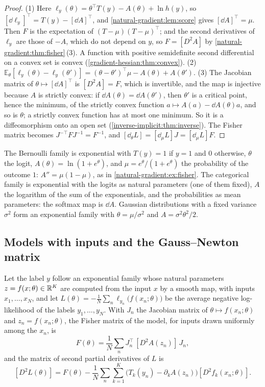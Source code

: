 \begin{notechapter}
\begin{proof}
(1) Here $\ell_y(\theta) = \theta^\top T(y) - A(\theta) + \ln h(y)$, so
$[\dd\ell_y]^\top = T(y) - [\dd A]^\top$, and
\cref{natural-gradient:lem:score} gives $[\dd A]^\top = \mu$. Then $F$ is
the expectation of $(T - \mu)(T - \mu)^\top$; and the second derivatives
of $\ell_y$ are those of $-A$, which do not depend on $y$, so
$F = [D^2A]$ by \cref{natural-gradient:thm:fisher}\,(3). A function with
positive semidefinite second differential on a convex set is convex
(\cref{gradient-hessian:thm:convex}).
(2) $\mathbb E_\theta[\ell_y(\theta) - \ell_y(\theta')]
= (\theta - \theta')^\top\mu - A(\theta) + A(\theta')$.
(3) The Jacobian matrix of $\theta\mapsto[\dd A]^\top$ is $[D^2A] = F$,
which is invertible, and the map is injective because $A$ is strictly
convex: if $\dd A(\theta) = \dd A(\theta')$, then $\theta'$ is a critical
point, hence the minimum, of the strictly convex function
$a\mapsto A(a) - \dd A(\theta)a$, and so is $\theta$; a strictly convex
function has at most one minimum. So it is a diffeomorphism onto
an open set (\cref{inverse-implicit:thm:inverse}). The Fisher matrix
becomes $J^{-\top}FJ^{-1} = F^{-1}$, and
$[\dd_\theta L] = [\dd_\mu L]J = [\dd_\mu L]F$.
\end{proof}

\begin{example}\label{natural-gradient:ex:expfam}
The Bernoulli family is exponential with $T(y) = 1$ if $y = 1$ and $0$
otherwise, $\theta$ the logit, $A(\theta) = \ln(1 + e^\theta)$, and
$\mu = e^\theta/(1 + e^\theta)$ the probability of the outcome $1$:
$A'' = \mu(1 - \mu)$, as in \cref{natural-gradient:ex:fisher}. The
categorical family is exponential with the logits as natural parameters
(one of them fixed), $A$ the logarithm of the sum of the exponentials,
and the probabilities as mean parameters: the softmax map is $\dd A$.
Gaussian distributions with a fixed variance $\sigma^2$ form an
exponential family with $\theta = \mu/\sigma^2$ and
$A = \sigma^2\theta^2/2$.
\end{example}

\subsection*{Models with inputs and the Gauss--Newton matrix}

\begin{proposition}\label{natural-gradient:prop:ggn}
Let the label $y$ follow an exponential family whose natural parameters
$z = f(x; \theta)\in\mathbb{R}^K$ are computed from the input $x$ by a smooth
map, with inputs $x_1,\dots,x_N$, and let
$L(\theta) = -\frac1N\sum_n\ell_{y_n}\bigl(f(x_n; \theta)\bigr)$ be the
average negative log-likelihood of the labels $y_1,\dots,y_N$. With $J_n$
the Jacobian matrix of $\theta\mapsto f(x_n; \theta)$ and
$z_n = f(x_n; \theta)$, the Fisher matrix of the model, for inputs drawn
uniformly among the $x_n$, is
\[
  F(\theta) = \frac1N\sum_nJ_n^\top\,[D^2A(z_n)]\,J_n ,
\]
and the matrix of second partial derivatives of $L$ is
\[
  [D^2L(\theta)] = F(\theta)
  - \frac1N\sum_n\sum_{k=1}^K\bigl(T_k(y_n) - \partial_kA(z_n)\bigr)
    [D^2f_k(x_n; \theta)] .
\]
\end{proposition}


\end{notechapter}
